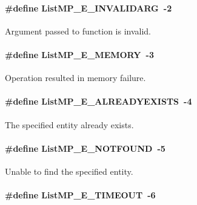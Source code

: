\paragraph[{ListMP\_\-E\_\-INVALIDARG}]{\setlength{\rightskip}{0pt plus 5cm}\#define ListMP\_\-E\_\-INVALIDARG~-\/2}\hfill\label{_list_m_p_8h_a0cfe16cd038629372772230866ef681f}


Argument passed to function is invalid. 

\paragraph[{ListMP\_\-E\_\-MEMORY}]{\setlength{\rightskip}{0pt plus 5cm}\#define ListMP\_\-E\_\-MEMORY~-\/3}\hfill\label{_list_m_p_8h_ae855742ffb668b39109633d3a3fe552c}


Operation resulted in memory failure. 

\paragraph[{ListMP\_\-E\_\-ALREADYEXISTS}]{\setlength{\rightskip}{0pt plus 5cm}\#define ListMP\_\-E\_\-ALREADYEXISTS~-\/4}\hfill\label{_list_m_p_8h_aa943a6dd86b5cd4092faa9a2c3650678}


The specified entity already exists. 

\paragraph[{ListMP\_\-E\_\-NOTFOUND}]{\setlength{\rightskip}{0pt plus 5cm}\#define ListMP\_\-E\_\-NOTFOUND~-\/5}\hfill\label{_list_m_p_8h_ad1094272ac41cf2b022d6c514beaceac}


Unable to find the specified entity. 

\paragraph[{ListMP\_\-E\_\-TIMEOUT}]{\setlength{\rightskip}{0pt plus 5cm}\#define ListMP\_\-E\_\-TIMEOUT~-\/6}\hfill\label{_list_m_p_8h_a163b8195b54eab051c94c37b6f76a3c0}


